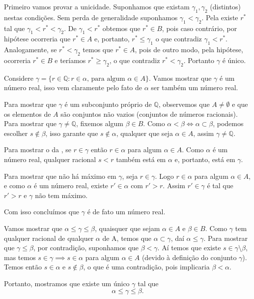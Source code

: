 \documentclass[../main.tex]{subfiles}
\begin{document}
\begin{dem}
    Primeiro vamos provar a unicidade. Suponhamos que existam $\gamma_1, \gamma_2$ (distintos) nestas condições. Sem perda de generalidade suponhamos $\gamma_1 < \gamma_2$.
    Pela  existe $r^*$ tal que $\gamma_1 < r^* < \gamma_2$. 
    De $\gamma_1 < r^*$ obtemos que $r^* \in B$, pois caso contrário, por hipótese ocorreria que $r^* \in A$ e, portanto, $r^* \leq \gamma_1$ o que contradiz $\gamma_1 < r^*$. Analogamente, se $r^* < \gamma_2$ temos que $r^* \in A$, pois de outro modo, pela hipótese, ocorreria $r^* \in B$ e teríamos $r^* \geq \gamma_2$, o que contradiz $ r^* < \gamma_2$. Portanto $\gamma$ é único.

    Considere $\gamma = \{ r \in \mathbb{Q} : r \in \alpha \text{, para algum } \alpha \in A \}$. Vamos mostrar que $\gamma$ é um número real, isso vem claramente pelo fato de $\alpha$ ser também um número real.
    
    Para mostrar que $\gamma$ é um subconjunto próprio de $\mathbb{Q}$, observemos que $A \neq \emptyset$ e que os elementos de $A$ são conjuntos não vazios (conjuntos de números racionais). Para mostrar que $\gamma \neq \mathbb{Q}$, fixemos algum $\beta \in B$. Como $\alpha < \beta \iff \alpha \subset \beta$, podemos escolher $s \not\in \beta$, isso garante que $s \not\in \alpha$, qualquer que seja $\alpha \in A$, assim $\gamma \neq \mathbb{Q}$.

    Para mostrar o  da , se $r \in \gamma$ então $r \in \alpha$ para algum $\alpha \in A$. Como $\alpha$ é um número real, qualquer racional $s < r$ também está em $\alpha$ e, portanto, está em $\gamma$.

    Para mostrar que não há máximo em $\gamma$, seja $r \in \gamma$. Logo $r \in \alpha$ para algum $\alpha \in A$, e como $\alpha$ é um número real, existe $r' \in \alpha$ com $r'>r$. Assim $r' \in \gamma$ é tal que $r' > r$ e $\gamma$ não tem máximo. 

    Com isso concluímos que $\gamma$ é de fato um número real.

    Vamos mostrar que $\alpha \leq \gamma \leq \beta$, quaisquer que sejam $\alpha \in A$ e $\beta \in B$.
    Como $\gamma$ tem qualquer racional de qualquer $\alpha$ de A, temos que $\alpha \subset \gamma$, daí $\alpha \leq \gamma$.
    Para mostrar que $\gamma \leq \beta$, por contradição, suponhamos que $\beta < \gamma$. Aí temos que existe $s \in \gamma \setminus \beta$, mas temos $s \in \gamma \implies s \in \alpha$ para algum $\alpha \in A$ (devido à definição do conjunto $\gamma$). Temos então $s \in \alpha$ e $s \not\in \beta$, o que é uma contradição, pois implicaria $\beta < \alpha$.   

    Portanto, mostramos que existe um único $\gamma$ tal que 
    \[\alpha \leq \gamma \leq \beta.\]
\end{dem}
\end{document}
